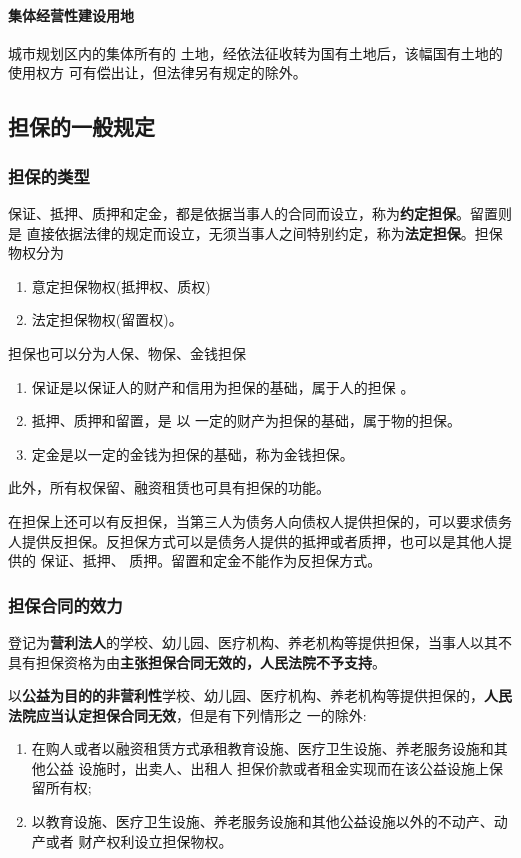 \documentclass[UTF8,12pt]{ctexart}
\numberwithin{equation}{section} %
\numberwithin{figure}{section}
\numberwithin{table}{section}
\begin{document}
	\paragraph{集体经营性建设用地}城市规划区内的集体所有的 土地，经依法征收转为国有土地后，该幅国有土地的使用权方 可有偿出让，但法律另有规定的除外。
	
	\subsection{担保的一般规定}
	
	\subsubsection{担保的类型}
	保证、抵押、质押和定金，都是依据当事人的合同而设立，称为\textbf{约定担保}。留置则是 直接依据法律的规定而设立，无须当事人之间特别约定，称为\textbf{法定担保}。担保物权分为
	\begin{enumerate}
		\item 意定担保物权(抵押权、质权)
		
		\item 法定担保物权(留置权)。
	\end{enumerate}
	
	担保也可以分为人保、物保、金钱担保
	\begin{enumerate}
		\item 保证是以保证人的财产和信用为担保的基础，属于人的担保 。
		
		\item 抵押、质押和留置，是 以 一定的财产为担保的基础，属于物的担保。
		
		\item 定金是以一定的金钱为担保的基础，称为金钱担保。
	\end{enumerate}
	此外，所有权保留、融资租赁也可具有担保的功能。
	
	
	在担保上还可以有反担保，当第三人为债务人向债权人提供担保的，可以要求债务人提供反担保。反担保方式可以是债务人提供的抵押或者质押，也可以是其他人提供的 保证、抵押、 质押。留置和定金不能作为反担保方式。
	
	\subsubsection{担保合同的效力}
	登记为\textbf{营利法人}的学校、幼儿园、医疗机构、养老机构等提供担保，当事人以其不具有担保资格为由\textbf{主张担保合同无效的，人民法院不予支持}。
	 
	以\textbf{公益为目的的非营利性}学校、幼儿园、医疗机构、养老机构等提供担保的，\textbf{人民法院应当认定担保合同无效}，但是有下列情形之 一的除外: 
	\begin{enumerate}
		\item 在购人或者以融资租赁方式承租教育设施、医疗卫生设施、养老服务设施和其他公益 设施时，出卖人、出租人 担保价款或者租金实现而在该公益设施上保留所有权;
		
		\item 以教育设施、医疗卫生设施、养老服务设施和其他公益设施以外的不动产、动产或者 财产权利设立担保物权。
	\end{enumerate}
	
\end{document}
